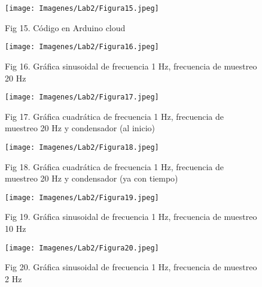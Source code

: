 \documentclass[
  letterpaper,
  DIV=11,
  numbers=noendperiod]{scrartcl}
\begin{document}
\begin{figure}[H]

{\centering \texttt{[image: Imagenes/Lab2/Figura15.jpeg]}

}

\caption{Fig 15. Código en Arduino cloud}

\end{figure}%
\begin{figure}[H]

{\centering \texttt{[image: Imagenes/Lab2/Figura16.jpeg]}

}

\caption{Fig 16. Gráfica sinusoidal de frecuencia 1 Hz, frecuencia de
muestreo 20 Hz}

\end{figure}%
\begin{figure}[H]

{\centering \texttt{[image: Imagenes/Lab2/Figura17.jpeg]}

}

\caption{Fig 17. Gráfica cuadrática de frecuencia 1 Hz, frecuencia de
muestreo 20 Hz y condensador (al inicio)}

\end{figure}%
\begin{figure}[H]

{\centering \texttt{[image: Imagenes/Lab2/Figura18.jpeg]}

}

\caption{Fig 18. Gráfica cuadrática de frecuencia 1 Hz, frecuencia de
muestreo 20 Hz y condensador (ya con tiempo)}

\end{figure}%
\begin{figure}[H]

{\centering \texttt{[image: Imagenes/Lab2/Figura19.jpeg]}

}

\caption{Fig 19. Gráfica sinusoidal de frecuencia 1 Hz, frecuencia de
muestreo 10 Hz}

\end{figure}%
\begin{figure}[H]

{\centering \texttt{[image: Imagenes/Lab2/Figura20.jpeg]}

}

\caption{Fig 20. Gráfica sinusoidal de frecuencia 1 Hz, frecuencia de
muestreo 2 Hz}

\end{figure}%
\end{document}
